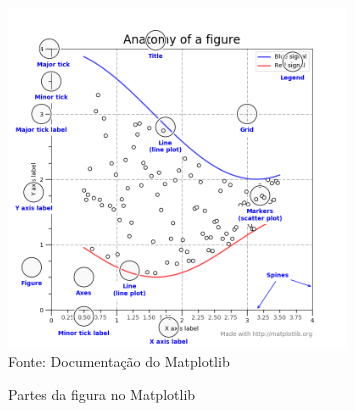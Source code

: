 \begin{itemize}
	\begin{figure}[htb!]
		\centering
		\caption{Partes da figura no Matplotlib}
		\label{fig:anatomy}
		\includegraphics[width=0.8\textwidth]{figs/anatomy}\\
		\tiny{Fonte: Documentação do Matplotlib}
	\end{figure}
	

\end{itemize}
